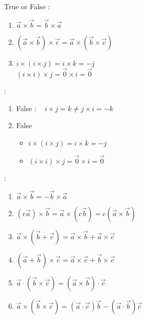 \noindent{\color{smalt(darkpowderblue)}\rule{\linewidth}{.2mm}}
\begin{example}
True or False :
\begin{enumerate}
\item ${\overrightarrow{a}}\times{\overrightarrow{b}} = {\overrightarrow{b}}\times{\overrightarrow{a}}$
\item  $({\overrightarrow{a}}\times{\overrightarrow{b}}) \times {\overrightarrow{c}} = {\overrightarrow{a}}\times ({\overrightarrow{b}}\times \overrightarrow{c}) $
\item  $i\times(i \times j) = i \times k = -j$\\
$(i \times i) \times j = \overrightarrow{0} \times i = \overrightarrow{0}$
\end{enumerate}
{} :
\begin{enumerate}
\item False : ~ $ i \times j = k \neq j \times i = -k $
\item False \begin{itemize}
\item $ i\times(i \times j) = i \times k = -j$
\item $(i \times i) \times j = \overrightarrow{0} \times i = \overrightarrow{0}$
\end{itemize}
\end{enumerate}
\end{example}
\noindent{\color{smalt(darkpowderblue)}\rule{\linewidth}{.2mm}}
{} : 
\begin{enumerate}
\item  ${\overrightarrow{a}}\times{\overrightarrow{b}} = -{\overrightarrow{b}}\times{\overrightarrow{a}}$
\item $(c{\overrightarrow{a}})\times{\overrightarrow{b}} = {\overrightarrow{a}}\times (c{\overrightarrow{b}}) = c({\overrightarrow{a}}\times{\overrightarrow{b}}) $
\item ${\overrightarrow{a}}\times({\overrightarrow{b}} + \overrightarrow{c}) = {\overrightarrow{a}}\times{\overrightarrow{b}} + 
{\overrightarrow{a}}\times{\overrightarrow{c}}$
\item $(\overrightarrow{a} + \overrightarrow{b}) \times \overrightarrow{c} = {\overrightarrow{a}}\times{\overrightarrow{c}} + {\overrightarrow{b}}\times{\overrightarrow{c}}$
\item $\overrightarrow{a} \cdot (\overrightarrow{b} \times \overrightarrow{c}) = (\overrightarrow{a} \times \overrightarrow{b}) \cdot \overrightarrow{c}$
\item $\overrightarrow{a} \times (\overrightarrow{b} \times \overrightarrow{c}) = (\overrightarrow{a} \cdot \overrightarrow{c}) \overrightarrow{b} - (\overrightarrow{a} 
\cdot \overrightarrow{b})\overrightarrow{c}$
\end{enumerate}
